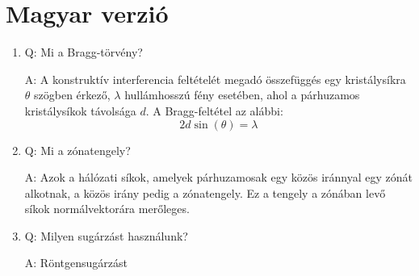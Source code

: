 \section{Magyar verzió}
\begin{enumerate}
	\item Q: Mi a Bragg-törvény?
    \begin{displayquote}
        A: A konstruktív interferencia feltételét megadó összefüggés egy kristálysíkra $\theta$ szögben érkező, $\lambda$ hullámhosszú fény esetében, ahol a párhuzamos kristálysíkok távolsága $d$. A Bragg-feltétel az alábbi:
        \begin{equation}
		2 d \sin \left( \theta \right) = \lambda
        \end{equation}
    \end{displayquote}
    \item Q: Mi a zónatengely?
    \begin{displayquote}
        A: Azok a hálózati síkok, amelyek párhuzamosak egy közös iránnyal egy zónát alkotnak, a közös irány pedig a zónatengely. Ez a tengely a zónában levő síkok normálvektorára merőleges.
    \end{displayquote}
    \item Q: Milyen sugárzást használunk?
    \begin{displayquote}
        A: Röntgensugárzást
    \end{displayquote}
\end{enumerate}